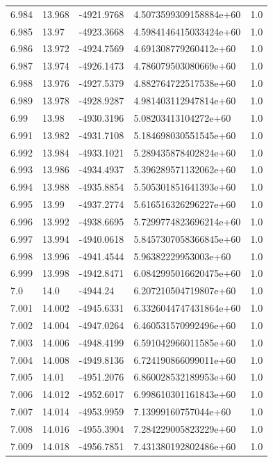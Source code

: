 \begin{tabular}{lllll}
6.984 & 13.968 & -4921.9768 & 4.5073599309158884e+60 & 1.0 \\
6.985 & 13.97 & -4923.3668 & 4.5984146415033424e+60 & 1.0 \\
6.986 & 13.972 & -4924.7569 & 4.691308779260412e+60 & 1.0 \\
6.987 & 13.974 & -4926.1473 & 4.786079503080669e+60 & 1.0 \\
6.988 & 13.976 & -4927.5379 & 4.882764722517538e+60 & 1.0 \\
6.989 & 13.978 & -4928.9287 & 4.981403112947814e+60 & 1.0 \\
6.99 & 13.98 & -4930.3196 & 5.08203413104272e+60 & 1.0 \\
6.991 & 13.982 & -4931.7108 & 5.184698030551545e+60 & 1.0 \\
6.992 & 13.984 & -4933.1021 & 5.289435878402824e+60 & 1.0 \\
6.993 & 13.986 & -4934.4937 & 5.396289571132062e+60 & 1.0 \\
6.994 & 13.988 & -4935.8854 & 5.505301851641393e+60 & 1.0 \\
6.995 & 13.99 & -4937.2774 & 5.616516326296227e+60 & 1.0 \\
6.996 & 13.992 & -4938.6695 & 5.7299774823696214e+60 & 1.0 \\
6.997 & 13.994 & -4940.0618 & 5.8457307058366845e+60 & 1.0 \\
6.998 & 13.996 & -4941.4544 & 5.96382229953003e+60 & 1.0 \\
6.999 & 13.998 & -4942.8471 & 6.0842995016620475e+60 & 1.0 \\
7.0 & 14.0 & -4944.24 & 6.207210504719807e+60 & 1.0 \\
7.001 & 14.002 & -4945.6331 & 6.3326044747431864e+60 & 1.0 \\
7.002 & 14.004 & -4947.0264 & 6.460531570992496e+60 & 1.0 \\
7.003 & 14.006 & -4948.4199 & 6.591042966011585e+60 & 1.0 \\
7.004 & 14.008 & -4949.8136 & 6.724190866099011e+60 & 1.0 \\
7.005 & 14.01 & -4951.2076 & 6.860028532189953e+60 & 1.0 \\
7.006 & 14.012 & -4952.6017 & 6.998610301161843e+60 & 1.0 \\
7.007 & 14.014 & -4953.9959 & 7.13999160757044e+60 & 1.0 \\
7.008 & 14.016 & -4955.3904 & 7.284229005823229e+60 & 1.0 \\
7.009 & 14.018 & -4956.7851 & 7.431380192802486e+60 & 1.0 \\

\end{tabular}
